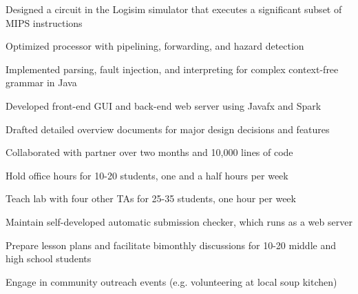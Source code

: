 \documentclass{resume}
\begin{document}
\begin{projects}
    \begin{description}
        \item Designed a circuit in the Logisim simulator that executes a significant subset of MIPS instructions
        \item Optimized processor with pipelining, forwarding, and hazard detection
    \end{description}

    \begin{description}
        \item Implemented parsing, fault injection, and interpreting for complex context-free grammar in Java
        \item Developed front-end GUI and back-end web server using Javafx and Spark
        \item Drafted detailed overview documents for major design decisions and features
        \item Collaborated with partner over two months and 10,000 lines of code
    \end{description}
\end{projects}

\begin{leadership experience}
    \begin{description}
        \item Hold office hours for 10-20 students, one and a half hours per week
        \item Teach lab with four other TAs for 25-35 students, one hour per week
        \item Maintain self-developed automatic submission checker, which runs as a web server
    \end{description}

    \begin{description}
        \item Prepare lesson plans and facilitate bimonthly discussions for 10-20 middle and high school students
        \item Engage in community outreach events (e.g. volunteering at local soup kitchen)
    \end{description}
\end{leadership experience}
\end{document}
